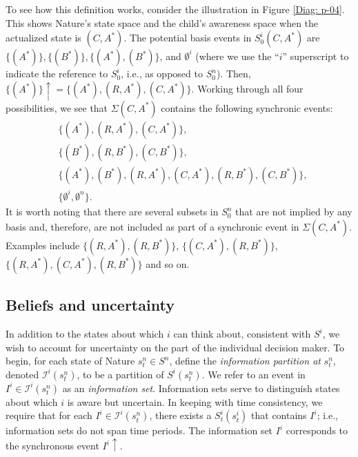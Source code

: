 \documentclass[
11pt,
titlepage,
reqno,
]{article}%
\theoremstyle{definition}
\begin{document}
	To see how this definition works, consider the illustration in Figure \ref{Diag: p-04}. 
	This shows Nature's state space and the child's  awareness space when the actualized state is $(C,A^\ast)$. 
	The potential basis events in $S^i_0(C,A^\ast)$ are $\{(A^\ast)\},\{(B^\ast)\},\{(A^\ast),(B^\ast)\}$, and $\emptyset^i$ (where we use the ``$i$'' superscript to indicate the reference to $S^i_0$, i.e., as opposed to $S^n_0$). 
	Then, $\{(A^\ast)\}\uparrow = \{(A^\ast), (R,A^\ast),(C,A^\ast)\}$. 
	Working through all four possibilities, we see that $\Sigma(C,A^\ast)$ contains the following synchronic events:
	\begin{align*}
		&	\{(A^\ast), (R,A^\ast),(C,A^\ast)\},\\
		&	\{(B^\ast), (R,B^\ast),(C,B^\ast)\},\\
		&	\{(A^\ast), (B^\ast), (R,A^\ast),(C,A^\ast), (R,B^\ast),(C,B^\ast)\},\\
		&	\{\emptyset^i,\emptyset^n\}.
	\end{align*}
	It is worth noting that there are several subsets in $S^n_0$ that are not implied by any basis and, therefore, are not included as part of a synchronic event in $\Sigma(C,A^\ast)$. Examples include $\{(R,A^\ast),(R,B^\ast)\}$, $\{(C,A^\ast),(R,B^\ast)\}$, $\{(R,A^\ast),(C,A^\ast),(R,B^\ast)\}$ and so on. 
	
	
	\subsection{Beliefs and uncertainty}
	
	In addition to the states about which $i$ can think about, consistent with $S^i$, we wish to account for uncertainty on the part of the individual decision maker. 
	To begin, for each state of Nature $s^n_t\in S^n$, define the\textit{ information partition at} $s^n_t$, denoted $\mathcal{I}^i(s^n_t)$,  to be a partition of $S^i(s^n_t)$. 
	We refer to an event in $I^i\in\mathcal{I}^i(s^n_t)$ as an \textit{information set}. 
	Information sets serve to distinguish states about which 	$i$ is aware but uncertain. 
	In keeping with time consistency, we require that for each $I^i\in\mathcal{I}^i(s^n_t)$, there exists a $S^i_t(s^i_t)$ that contains $I^i$; i.e., information sets do not span time periods.  
	The information set $I^i$ corresponds to the synchronous event $I^i\uparrow$.
	
\end{document}
